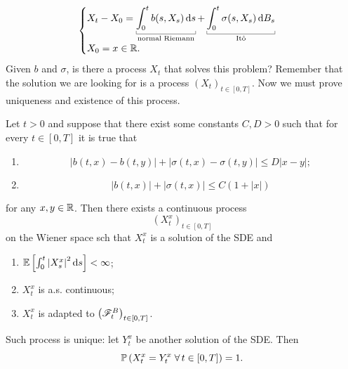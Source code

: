 \documentclass[12pt]{report}
\begin{document}
\begin{equation*}
	\begin{cases}
		X_{t}-X_{0}=\ubracketthin{\int_{0}^{t}b(s,X_{s})\ds}_{\claptext{normal Riemann}}+\ubracketthin{\int_{0}^{t}\sigma(s,X_{s})\dbs}_{\claptext{\ito}}\\
		X_{0}=x\in\R.
	\end{cases}
\end{equation*}
Given $b$ and $\sigma$, is there a process $X_{t}$ that solves this problem? Remember that the solution we are looking for is a process ${(X_{t})}_{t\in[0,T]}$. Now we must prove uniqueness and existence of this process.
\begin{theorem}
	Let $t>0$ and suppose that there exist some constants $C,D>0$ such that for every $t\in[0,T]$ it is true that
	\begin{enumerate}
		\item 
		\begin{equation*}
			\left|b(t,x)-b(t,y)\right|+\left|\sigma(t,x)-\sigma(t,y)\right|\leq D|x-y|;
		\end{equation*}
		\item 
		\begin{equation*}
			\left|b(t,x)\right|+\left|\sigma(t,x)\right|\leq C(1+|x|)
		\end{equation*}
	\end{enumerate}
	for any $x,y\in\mathbb{R}$. Then there exists a continuous process
	\begin{equation*}
		{\left(X^{x}_{t}\right)}_{t\in[0,T]}
	\end{equation*}
	on the Wiener space sch that $X^{x}_{t}$ is a solution of the SDE and
	\begin{enumerate}
		\item $\mathbb{E}\left[\int_{0}^{t}\left|X^{x}_{s}\right|^{2}\mathop{}\!\mathrm{d} s\right]<\infty$;
		\item $X^{x}_{t}$ is a.s. continuous;
		\item $X^{x}_{t}$ is adapted to ${\left(\mathscr{F}^{B}_{t}\right)}_{t\in[0,T]}$.
	\end{enumerate}
	Such process is unique: let $Y^{x}_{t}$ be another solution of the SDE. Then
	\begin{equation*}
		\mathbb{P}\left(X^{x}_{t}=Y^{x}_{t}\;\forall\, t\in[0,T]\right)=1.
	\end{equation*}
\end{theorem}
\end{document}
